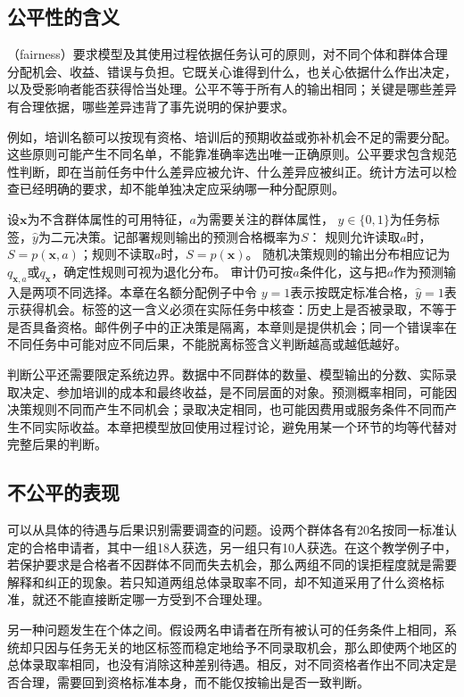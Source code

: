 \subsection{公平性的含义}
\label{sec:fairness-meaning}

（fairness）要求模型及其使用过程依据任务认可的原则，对不同个体和群体合理分配机会、收益、错误与负担。它既关心谁得到什么，也关心依据什么作出决定，以及受影响者能否获得恰当处理。公平不等于所有人的输出相同；关键是哪些差异有合理依据，哪些差异违背了事先说明的保护要求。

例如，培训名额可以按现有资格、培训后的预期收益或弥补机会不足的需要分配。这些原则可能产生不同名单，不能靠准确率选出唯一正确原则。公平要求包含规范性判断，即在当前任务中什么差异应被允许、什么差异应被纠正。统计方法可以检查已经明确的要求，却不能单独决定应采纳哪一种分配原则。

设$\bm{x}$为不含群体属性的可用特征，$a$为需要关注的群体属性，
$y\in\{0,1\}$为任务标签，$\hat y$为二元决策。记部署规则输出的预测合格概率为$S$：
规则允许读取$a$时，$S=p(\bm{x},a)$；规则不读取$a$时，$S=p(\bm{x})$。
随机决策规则的输出分布相应记为$q_{\bm{x},a}$或$q_{\bm{x}}$，确定性规则可视为退化分布。
审计仍可按$a$条件化，这与把$a$作为预测输入是两项不同选择。本章在名额分配例子中令
$y=1$表示按既定标准合格，$\hat y=1$表示获得机会。标签的这一含义必须在实际任务中核查：历史上是否被录取，不等于是否具备资格。邮件例子中的正决策是隔离，本章则是提供机会；同一个错误率在不同任务中可能对应不同后果，不能脱离标签含义判断越高或越低越好。

判断公平还需要限定系统边界。数据中不同群体的数量、模型输出的分数、实际录取决定、参加培训的成本和最终收益，是不同层面的对象。预测概率相同，可能因决策规则不同而产生不同机会；录取决定相同，也可能因费用或服务条件不同而产生不同实际收益。本章把模型放回使用过程讨论，避免用某一个环节的均等代替对完整后果的判断。

\subsection{不公平的表现}
\label{sec:fairness-manifestations}

可以从具体的待遇与后果识别需要调查的问题。设两个群体各有20名按同一标准认定的合格申请者，其中一组18人获选，另一组只有10人获选。在这个教学例子中，若保护要求是合格者不因群体不同而失去机会，那么两组不同的误拒程度就是需要解释和纠正的现象。若只知道两组总体录取率不同，却不知道采用了什么资格标准，就还不能直接断定哪一方受到不合理处理。

另一种问题发生在个体之间。假设两名申请者在所有被认可的任务条件上相同，系统却只因与任务无关的地区标签而稳定地给予不同录取机会，那么即使两个地区的总体录取率相同，也没有消除这种差别待遇。相反，对不同资格者作出不同决定是否合理，需要回到资格标准本身，而不能仅按输出是否一致判断。

